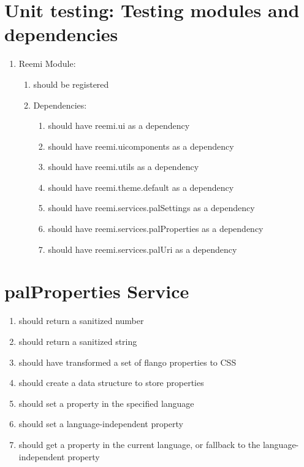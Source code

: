 \begin{singlespace}
\section*{Unit testing: Testing modules and dependencies}
\begin{enumerate}
\item     Reemi Module:
\begin{enumerate}
\item         should be registered
\item         Dependencies:
\begin{enumerate}
\item             should have reemi.ui as a dependency
\item             should have reemi.uicomponents as a dependency
\item             should have reemi.utils as a dependency
\item             should have reemi.theme.default as a dependency
\item             should have reemi.services.palSettings as a dependency
\item             should have reemi.services.palProperties as a dependency
\item             should have reemi.services.palUri as a dependency
\end{enumerate}
\end{enumerate}
\end{enumerate}

\section*{palProperties Service}
\begin{enumerate}
\item         should return a sanitized number
\item         should return a sanitized string
\item         should have transformed a set of flango properties to CSS
\item         should create a data structure to store properties
\item         should set a property in the specified language
\item         should set a language-independent property
\item         should get a property in the current language, or fallback to the language-independent property
\end{enumerate}


\end{singlespace}
